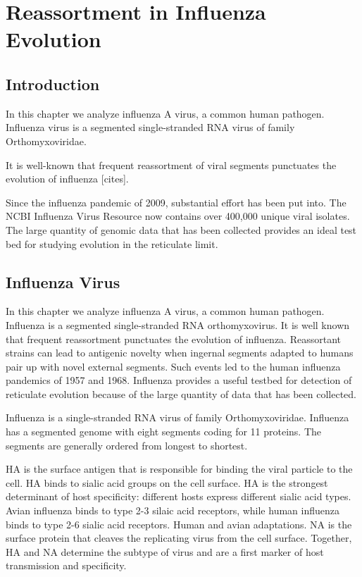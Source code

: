 
\chapter{Reassortment in Influenza Evolution}
\label{ch:flu}

\section{Introduction}
\label{flu:introduction}

In this chapter we analyze influenza A virus, a common human pathogen.
Influenza virus is a segmented single-stranded RNA virus of family Orthomyxoviridae.


It is well-known that frequent reassortment of viral segments punctuates the evolution of influenza [cites].


Since the influenza pandemic of 2009, substantial effort has been put into.
The NCBI Influenza Virus Resource now contains over 400,000 unique viral isolates.
The large quantity of genomic data that has been collected provides an ideal test bed for studying evolution in the reticulate limit.

\section{Influenza Virus}
\label{flu:introduction}


In this chapter we analyze influenza A virus, a common human pathogen.
Influenza is a segmented single-stranded RNA orthomyxovirus.
It is well known that frequent reassortment punctuates the evolution of influenza.
Reassortant strains can lead to antigenic novelty when ingernal segments adapted to humans pair up with novel external segments.
Such events led to the human influenza pandemics of 1957 and 1968.
Influenza provides a useful testbed for detection of reticulate evolution because of the large quantity of data that has been collected.


Influenza is a single-stranded RNA virus of family Orthomyxoviridae.
Influenza has a segmented genome with eight segments coding for 11 proteins.
The segments are generally ordered from longest to shortest.

HA is the surface antigen that is responsible for binding the viral particle to the cell.
HA binds to sialic acid groups on the cell surface.
HA is the strongest determinant of host specificity: different hosts express different sialic acid types.
Avian influenza binds to type 2-3 silaic acid receptors, while human influenza binds to type 2-6 sialic acid receptors.
Human and avian adaptations.
NA is the surface protein that cleaves the replicating virus from the cell surface.
Together, HA and NA determine the subtype of virus and are a first marker of host transmission and specificity.


